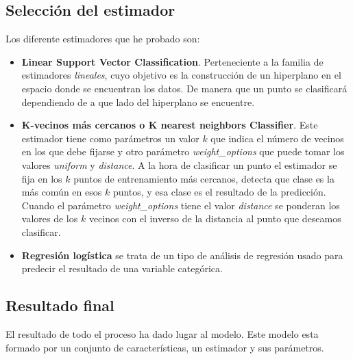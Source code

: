 \subsection{Selección del estimador}
Los diferente estimadores que he probado son:

\begin{itemize}
\item \textbf{Linear Support Vector Classification}. Perteneciente a la familia de estimadores \textit{lineales}, cuyo objetivo es la construcción de un hiperplano en el espacio donde se encuentran los datos. De manera que un punto se clasificará dependiendo de a que lado del hiperplano se encuentre.

\item \textbf{K-vecinos más cercanos o K nearest neighbors Classifier}. Este estimador tiene como parámetros un valor $k$ que indica el número de vecinos en los que debe fijarse y otro parámetro \textit{weight\_options} que puede tomar los valores \textit{uniform} y \textit{distance}.
A la hora de clasificar un punto el estimador se fija en los $k$ puntos de entrenamiento más cercanos, detecta que clase es la más común en esos $k$ puntos, y esa clase es el resultado de la predicción. Cuando el parámetro \textit{weight\_options} tiene el valor \textit{distance} se ponderan los valores de los $k$ vecinos con el inverso de la distancia al punto que deseamos clasificar.

\item \textbf{Regresión logística} se trata de un tipo de análisis de regresión usado para predecir el resultado de una variable categórica.

\end{itemize}


\subsection{Resultado final}

El resultado de todo el proceso ha dado lugar al modelo. Este modelo esta formado por un conjunto de características, un estimador y sus parámetros.

